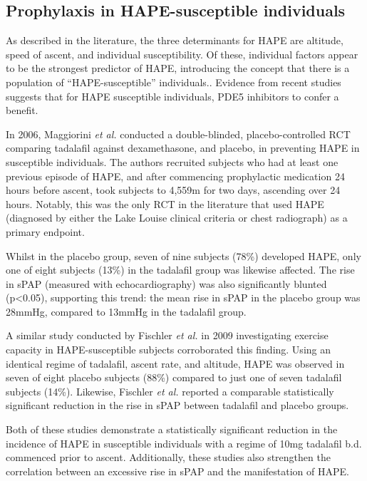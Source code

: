 \documentclass[12pt,a4paper]{article}
\begin{document}
\subsection*{Prophylaxis in HAPE-susceptible individuals}

As described in the literature, the three determinants for HAPE are altitude, speed of ascent, and individual susceptibility.\cite{Bartsch:2001kc,Bartsch:2002cg,Dehnert:2005ca} Of these, individual factors appear to be the strongest predictor of HAPE,\cite{Bartsch:2002cg} introducing the concept that there is a population of ``HAPE-susceptible'' individuals.\cite{Bartsch:2001kc,Dehnert:2005ca}. Evidence from recent studies suggests that for HAPE susceptible individuals, PDE5 inhibitors to confer a benefit.

In 2006, Maggiorini \emph{et al.} conducted a double-blinded, placebo-controlled RCT comparing tadalafil against dexamethasone, and placebo, in preventing HAPE in susceptible individuals.\cite{Maggiorini:2006kz} The authors recruited subjects who had at least one previous episode of HAPE, and after commencing prophylactic medication 24 hours before ascent, took subjects to 4,559m for two days, ascending over 24 hours. Notably, this was the only RCT in the literature that used HAPE (diagnosed by either the Lake Louise clinical criteria\cite{Sutton:1991wx} or chest radiograph) as a primary endpoint.

Whilst in the placebo group, seven of nine subjects (78\%) developed HAPE, only one of eight subjects (13\%) in the tadalafil group was likewise affected. The rise in sPAP (measured with echocardiography) was also significantly blunted (p<0.05), supporting this trend: the mean rise in sPAP in the placebo group was 28mmHg, compared to 13mmHg in the tadalafil group.\cite{Maggiorini:2006kz}

A similar study conducted by Fischler \emph{et al.} in 2009 investigating exercise capacity in HAPE-susceptible subjects corroborated this finding. Using an identical regime of tadalafil, ascent rate, and altitude, HAPE was observed in seven of eight placebo subjects (88\%) compared to just one of seven tadalafil subjects (14\%). Likewise, Fischler \emph{et al.} reported a comparable statistically significant reduction in the rise in sPAP between tadalafil and placebo groups.\cite{Fischler:2009ce}

Both of these studies demonstrate a statistically significant reduction in the incidence of HAPE in susceptible individuals with a regime of 10mg tadalafil b.d. commenced prior to ascent. Additionally, these studies also strengthen the correlation between an excessive rise in sPAP and the manifestation of HAPE.
\end{document}
